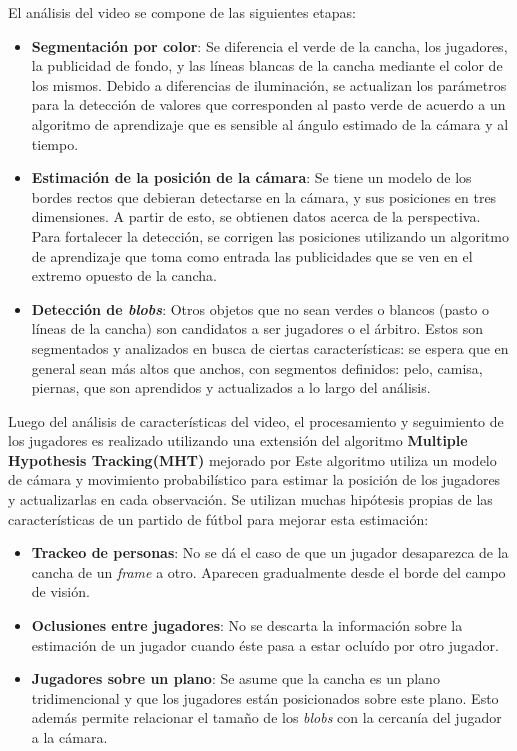 \documentclass[a4paper,10pt]{article}
\begin{document}
El análisis del video se compone de las siguientes etapas:

\begin{itemize}
  \item \textbf{Segmentación por color}: Se diferencia el verde de la cancha, los jugadores, la publicidad de fondo,
  y las líneas blancas de la cancha mediante el color de los mismos. Debido a diferencias de
  iluminación, se actualizan los parámetros para la detección de valores que corresponden al pasto verde de acuerdo
  a un algoritmo de aprendizaje que es sensible al ángulo estimado de la cámara y al tiempo.
  \item \textbf{Estimación de la posición de la cámara}: Se tiene un modelo de los bordes rectos que debieran detectarse
  en la cámara, y sus posiciones en tres dimensiones. A partir de esto, se obtienen datos acerca de la perspectiva.
  Para fortalecer la detección, se
  corrigen las posiciones utilizando un algoritmo de aprendizaje que toma como entrada las publicidades que se ven en 
  el extremo opuesto de la cancha.
  \item \textbf{Detección de \textit{blobs}}: Otros objetos que no sean verdes o blancos (pasto o líneas de la cancha)
  son candidatos a ser jugadores o el árbitro. Estos son segmentados y analizados en busca de ciertas características:
  se espera que en general sean más altos que anchos, con segmentos definidos: pelo, camisa, piernas, que son
  aprendidos y actualizados a lo largo del análisis.
\end{itemize}

Luego del análisis de características del video, el procesamiento y seguimiento de los jugadores es realizado utilizando
una extensión del algoritmo \textbf{Multiple Hypothesis Tracking(MHT)} \cite{MHT-1, MHT-2} mejorado por \citeauthor*{Schmitt-1, Schmitt-2}
Este algoritmo utiliza un modelo de cámara y movimiento probabilístico para estimar la posición de los jugadores
y actualizarlas en cada observación. Se utilizan muchas hipótesis propias de las características de un partido
de fútbol para mejorar esta estimación: 
\begin{itemize}
  \item \textbf{Trackeo de personas}: No se dá el caso de que un jugador desaparezca de la cancha de un \textit{frame}
  a otro. Aparecen gradualmente desde el borde del campo de visión.
  \item \textbf{Oclusiones entre jugadores}: No se descarta la información sobre la estimación de un jugador cuando 
  éste pasa a estar ocluído por otro jugador.
  \item \textbf{Jugadores sobre un plano}: Se asume que la cancha es un plano tridimencional y que los jugadores
  están posicionados sobre este plano. Esto además permite relacionar el tamaño de los \textit{blobs} con la cercanía
  del jugador a la cámara.
\end{itemize}
\end{document}
